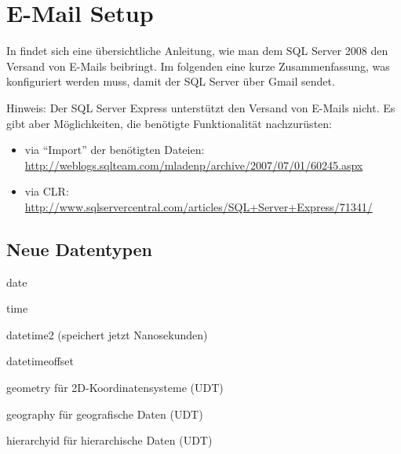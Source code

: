 \documentclass[12pt,ngerman,a4paper,index=totoc,twoside]{scrartcl}
\begin{document}
\section{E-Mail Setup}

In \cite{email:setup} findet sich eine übersichtliche Anleitung, wie man dem SQL Server 2008 den Versand von E-Mails beibringt. Im folgenden eine kurze Zusammenfassung, was konfiguriert werden muss, damit der SQL Server über Gmail sendet.

Hinweis: Der SQL Server Express unterstützt den Versand von E-Mails nicht. Es gibt aber Möglichkeiten, die benötigte Funktionalität nachzurüsten:

\begin{itemize}
	\item via \enquote{Import} der benötigten Dateien: \url{http://weblogs.sqlteam.com/mladenp/archive/2007/07/01/60245.aspx}
	\item via CLR: \url{http://www.sqlservercentral.com/articles/SQL+Server+Express/71341/}
\end{itemize}

\subsection{Neue Datentypen}

\begin{compactitem}
 \item date
 \item time
 \item datetime2 (speichert jetzt Nanosekunden)
 \item datetimeoffset
 \item geometry für 2D-Koordinatensysteme (UDT)
 \item geography für geografische Daten (UDT)
 \item hierarchyid für hierarchische Daten (UDT)
\end{compactitem}

\printindex

\nocite{*}

\printbibliography
\end{document}
